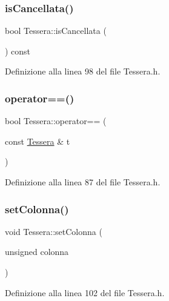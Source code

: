 \subsubsection{\texorpdfstring{is\+Cancellata()}{isCancellata()}}
{\footnotesize\ttfamily bool Tessera\+::is\+Cancellata (\begin{DoxyParamCaption}{ }\end{DoxyParamCaption}) const\hspace{0.3cm}{\ttfamily [inline]}}



Definizione alla linea 98 del file Tessera.\+h.

\mbox{\label{class_tessera_a6cfbdaa4b6f790712fb474d4aaa443dc}} 
\subsubsection{\texorpdfstring{operator==()}{operator==()}}
{\footnotesize\ttfamily bool Tessera\+::operator== (\begin{DoxyParamCaption}\item[{const \hyperlink{class_tessera}{Tessera} \&}]{t }\end{DoxyParamCaption})\hspace{0.3cm}{\ttfamily [inline]}}



Definizione alla linea 87 del file Tessera.\+h.

\mbox{\label{class_tessera_aaadd2a26daf280323146037ee82e6c31}} 
\subsubsection{\texorpdfstring{set\+Colonna()}{setColonna()}}
{\footnotesize\ttfamily void Tessera\+::set\+Colonna (\begin{DoxyParamCaption}\item[{unsigned}]{colonna }\end{DoxyParamCaption})\hspace{0.3cm}{\ttfamily [inline]}}



Definizione alla linea 102 del file Tessera.\+h.

\mbox{\label{class_tessera_a005db63e4b48f264ecab763de25d83c0}} 
